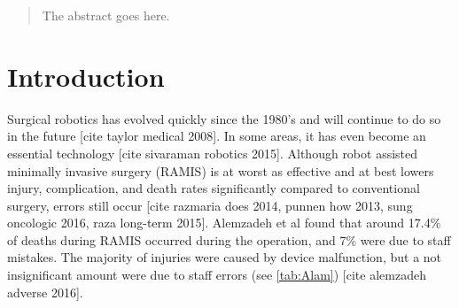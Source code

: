 \documentclass[conference]{IEEEtran}
\begin{document}




\maketitle

\begin{abstract}
The abstract goes here.
\end{abstract}





%
\IEEEpeerreviewmaketitle



\section{Introduction}

Surgical robotics has evolved quickly since the 1980's and will continue to do so in the future [cite taylor medical 2008]. In some areas, it has even become an essential technology [cite sivaraman robotics 2015]. Although robot assisted minimally invasive surgery (RAMIS) is at worst as effective and at best lowers injury, complication, and death rates significantly compared to conventional surgery, errors still occur [cite razmaria does 2014, punnen how 2013, sung oncologic 2016, raza long-term 2015]. Alemzadeh et al found that around 17.4\% of deaths during RAMIS occurred during the operation, and 7\% were due to staff mistakes. The majority of injuries were caused by device malfunction, but a not insignificant amount were due to staff errors (see \autoref{tab:Alam}) [cite alemzadeh adverse 2016].
\end{document}
